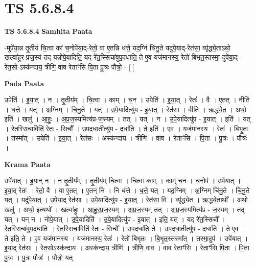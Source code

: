 \documentclass[17pt]{extarticle}
\begin{document}
\section{ TS 5.6.8.4 }

\textbf{TS 5.6.8.4 } \newline
\textbf{Samhita Paata} \newline

-मुपे॑या॒न्न तृ॒तीयं॑ चि॒त्वा कां च॒नोपे॑या॒द्-रेतो॒ वा ए॒तन्नि ध॑त्ते॒ यद॒ग्निं चि॑नु॒ते यदु॑पे॒याद्-रेत॑सा॒ व्यृ॑द्ध्ये॒ताऽथो॒ खल्वा॑हुर प्रज॒स्यं तद्-यन्नोपे॒यादिति॒ यद्-रे॑त॒स्सिचा॑वुप॒दधा॑ति॒ ते ए॒व यज॑मानस्य॒ रेतो॑ बिभृत॒स्तस्मा॒-दुपे॑या॒द्-रेत॒सो-ऽस्क॑न्दाय॒ त्रीणि॒ वाव रेताꣳ॑सि पि॒ता पु॒त्रः पौत्रो॒ - [  ] \newline

\textbf{Pada Paata} \newline

उपेति॑ । इ॒या॒त् । न । तृ॒तीय᳚म् । चि॒त्वा । काम् । च॒न । उपेति॑ । इ॒या॒त् । रेतः॑ । वै । ए॒तत् । नीति॑ । ध॒त्ते॒ । यत् । अ॒ग्निम् । चि॒नु॒ते । यत् । उ॒पे॒यादित्यु॑प - इ॒यात् । रेत॑सा । वीति॑ । ऋ॒द्ध्ये॒त॒ । अथो॒ इति॑ । खलु॑ । आ॒हुः॒ । अ॒प्र॒ज॒स्यमित्य॑प्र-ज॒स्यम् । तत् । यत् । न । उ॒पे॒यादित्यु॑प - इ॒यात् । इति॑ । यत् । रे॒त॒स्सिचा॒विति॑ रेतः - सिचौ᳚ । उ॒प॒दधा॒तीत्यु॑प - दधा॑ति । ते इति॑ । ए॒व । यज॑मानस्य । रेतः॑ । बि॒भृ॒तः॒ । तस्मा᳚त् । उपेति॑ । इ॒या॒त् । रेत॑सः । अस्क॑न्दाय । त्रीणि॑ । वाव । रेताꣳ॑सि । पि॒ता । पु॒त्रः । पौत्रः॑ ।  \newline


\textbf{Krama Paata} \newline

उपे॑यात् । इ॒या॒न् न । न तृ॒तीय᳚म् । तृ॒तीय॑म् चि॒त्वा । चि॒त्वा काम् । काम् च॒न । च॒नोप॑ । उपे॑यात् । इ॒या॒द् रेतः॑ । रेतो॒ वै । वा ए॒तत् । ए॒तन् नि । नि ध॑त्ते । ध॒त्ते॒ यत् । यद॒ग्निम् । अ॒ग्निम् चि॑नु॒ते । चि॒नु॒ते यत् । यदु॑पे॒यात् । उ॒पे॒याद् रेत॑सा । उ॒पे॒यादित्यु॑प - इ॒यात् । रेत॑सा॒ वि । व्यृ॑द्ध्येत । ऋ॒द्ध्ये॒ताथो᳚ । अथो॒ खलु॑ । अथो॒ इत्यथो᳚ । खल्वा॑हुः । आ॒हु॒र॒प्र॒ज॒स्यम् । अ॒प्र॒ज॒स्यम् तत् । अ॒प्र॒ज॒स्यमित्य॑प्र - ज॒स्यम् । तद् यत् । यन् न । नोपे॒यात् । उ॒पे॒यादिति॑ । उ॒पे॒यादित्यु॑प - इ॒यात् । इति॒ यत् । यद् रे॑त॒स्सिचौ᳚ । रे॒त॒स्सिचा॑वुप॒दधा॑ति । रे॒त॒स्सिचा॒विति॑ रेतः - सिचौ᳚ । उ॒प॒दधा॑ति॒ ते । उ॒प॒दधा॒तीत्यु॑प - दधा॑ति । ते ए॒व । ते इति॒ ते । ए॒व यज॑मानस्य । यज॑मानस्य॒ रेतः॑ । रेतो॑ बिभृतः । बि॒भृ॒त॒स्तस्मा᳚त् । तस्मा॒दुप॑ । उपे॑यात् । इ॒या॒द् रेत॑सः । रेत॒सोऽस्क॑न्दाय । अस्क॑न्दाय॒ त्रीणि॑ । त्रीणि॒ वाव । वाव रेताꣳ॑सि । रेताꣳ॑सि पि॒ता । पि॒ता पु॒त्रः । पु॒त्रः पौत्रः॑ । पौत्रो॒ यत् \newline
\end{document}
